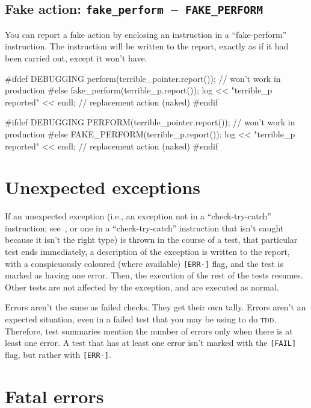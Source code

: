 \documentclass[twoside, a4paper, article]{memoir}
\newcommand*\testudocolor{\color{red!80!blue}}
\newcommand*\testudo[1]{\texttt{\testudocolor{}#1}}
\newcommand*\testudopair[2]{\testudo{#1}~--~\testudo{#2}}
\newcommand\subsectiontestudopair[3]{%
  \subsection[#1]{#1: \testudopair{#2}{#3}}}
\begin{document}
\subsectiontestudopair{Fake action}{fake\_perform}{FAKE\_PERFORM}
\label{sec:fake-action}

You can report a fake action by enclosing an instruction in a ``fake-perform''
instruction.  The instruction will be written to the report, exactly as if it
had been carried out, except it won't have.
\begin{cpplisting}
#ifdef DEBUGGING
perform(terrible_pointer.report()); // won't work in production
#else
fake_perform(terrible_p.report());
log << "terrible_p reported" << endl; // replacement action (naked)
#endif
\end{cpplisting}

\begin{cpplisting}
#ifdef DEBUGGING
PERFORM(terrible_pointer.report()); // won't work in production
#else
FAKE_PERFORM(terrible_p.report());
log << "terrible_p reported" << endl; // replacement action (naked)
#endif
\end{cpplisting}


\section{Unexpected exceptions}
\label{sec:unexpected-exceptions}

If an unexpected exception (i.e., an exception not in a ``check-try-catch''
instruction; see~, or one in a ``check-try-catch''
instruction that isn't caught because it isn't the right type) is thrown in the
course of a test, that particular test ends immediately, a description of the
exception is written to the report, with a conspicuously coloured (where
available) \verb|[ERR-]| flag, and the test is marked as having one error.
Then, the execution of the rest of the tests resumes.  Other tests are not
affected by the exception, and are executed as normal.

Errors aren't the same as failed checks.  They get their own tally.  Errors
aren't an expected situation, even in a failed test that you may be using to do
\textsc{tdd}.  Therefore, test summaries mention the number of errors only
when there is at least one error.  A test that has at least one error isn't
marked with the \verb|[FAIL]| flag, but rather with \verb|[ERR-]|.


\section{Fatal errors}
\label{sec:fatal-errors}
\end{document}
